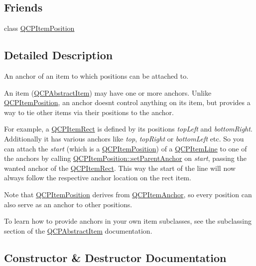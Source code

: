 \subsection*{Friends}
\begin{DoxyCompactItemize}
\item 
class \mbox{\hyperlink{class_q_c_p_item_anchor_aa9b8ddc062778e202a0be06a57d18d17}{Q\+C\+P\+Item\+Position}}
\end{DoxyCompactItemize}


\subsection{Detailed Description}
An anchor of an item to which positions can be attached to. 

An item (\mbox{\hyperlink{class_q_c_p_abstract_item}{Q\+C\+P\+Abstract\+Item}}) may have one or more anchors. Unlike \mbox{\hyperlink{class_q_c_p_item_position}{Q\+C\+P\+Item\+Position}}, an anchor doesn\textquotesingle{}t control anything on its item, but provides a way to tie other items via their positions to the anchor.

For example, a \mbox{\hyperlink{class_q_c_p_item_rect}{Q\+C\+P\+Item\+Rect}} is defined by its positions {\itshape top\+Left} and {\itshape bottom\+Right}. Additionally it has various anchors like {\itshape top}, {\itshape top\+Right} or {\itshape bottom\+Left} etc. So you can attach the {\itshape start} (which is a \mbox{\hyperlink{class_q_c_p_item_position}{Q\+C\+P\+Item\+Position}}) of a \mbox{\hyperlink{class_q_c_p_item_line}{Q\+C\+P\+Item\+Line}} to one of the anchors by calling \mbox{\hyperlink{class_q_c_p_item_position_ac094d67a95d2dceafa0d50b9db3a7e51}{Q\+C\+P\+Item\+Position\+::set\+Parent\+Anchor}} on {\itshape start}, passing the wanted anchor of the \mbox{\hyperlink{class_q_c_p_item_rect}{Q\+C\+P\+Item\+Rect}}. This way the start of the line will now always follow the respective anchor location on the rect item.

Note that \mbox{\hyperlink{class_q_c_p_item_position}{Q\+C\+P\+Item\+Position}} derives from \mbox{\hyperlink{class_q_c_p_item_anchor}{Q\+C\+P\+Item\+Anchor}}, so every position can also serve as an anchor to other positions.

To learn how to provide anchors in your own item subclasses, see the subclassing section of the \mbox{\hyperlink{class_q_c_p_abstract_item}{Q\+C\+P\+Abstract\+Item}} documentation. 

\subsection{Constructor \& Destructor Documentation}
\mbox{\label{class_q_c_p_item_anchor_a32573023c6fa65b4496f1f995e5bfa5f}} 
